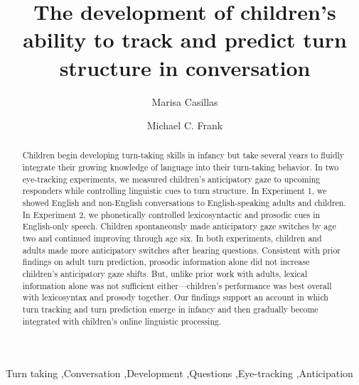 \documentclass[authoryear, 12pt]{elsarticle}
\begin{document}
\begin{frontmatter}

\title{The development of children's ability to track and predict turn structure in conversation}

\author[MPI]{Marisa Casillas}
\address[MPI]{Max Planck Institute for Psycholinguistics, Nijmegen}

\author[StanfordPSY]{Michael C. Frank}

\address[StanfordPSY]{Department of Psychology, Stanford University}

\begin{abstract}
Children begin developing turn-taking skills in infancy but take several years to fluidly integrate their growing knowledge of language into their turn-taking behavior. In two eye-tracking experiments, we measured children's anticipatory gaze to upcoming responders while controlling linguistic cues to turn structure. In Experiment 1, we showed English and non-English conversations to English-speaking adults and children. In Experiment 2, we phonetically controlled lexicosyntactic and prosodic cues in English-only speech. Children spontaneously made anticipatory gaze switches by age two and continued improving through age six. In both experiments, children and adults made more anticipatory switches after hearing questions. Consistent with prior findings on adult turn prediction, prosodic information alone did not increase children's anticipatory gaze shifts. But, unlike prior work with adults, lexical information alone was not sufficient either---children's performance was best overall with lexicosyntax and prosody together. Our findings support an account in which turn tracking and turn prediction emerge in infancy and then gradually become integrated with children's online linguistic processing.
\end{abstract}

\begin{keyword}
Turn taking \sep Conversation \sep Development \sep Questions \sep Eye-tracking \sep Anticipation

\end{keyword}

\end{frontmatter}
\end{document}
